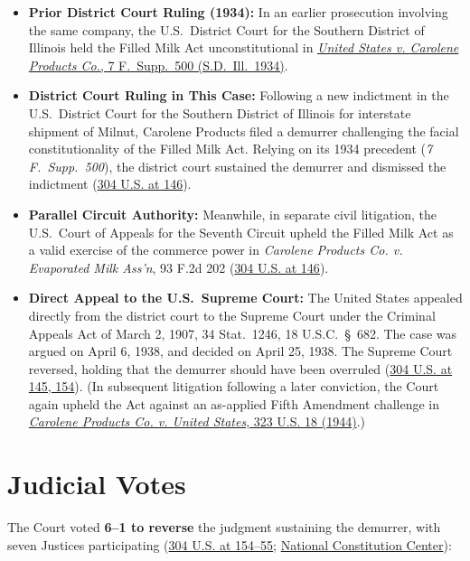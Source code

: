 \documentclass[12pt]{article}
\begin{document}
\begin{itemize}
    \item \textbf{Prior District Court Ruling (1934):} In an earlier prosecution involving the same company, the U.S.~District Court for the Southern District of Illinois held the Filled Milk Act unconstitutional in \href{https://law.justia.com/cases/federal/district-courts/FSupp/7/500/1943047/}{\textit{United States v. Carolene Products Co.}, 7 F.~Supp.~500 (S.D.~Ill.~1934)}.
    \item \textbf{District Court Ruling in This Case:} Following a new indictment in the U.S.~District Court for the Southern District of Illinois for interstate shipment of Milnut, Carolene Products filed a demurrer challenging the facial constitutionality of the Filled Milk Act. Relying on its 1934 precedent (\textit{7 F.~Supp.~500}), the district court sustained the demurrer and dismissed the indictment (\href{https://supreme.justia.com/cases/federal/us/304/144/}{304 U.S. at 146}).
    \item \textbf{Parallel Circuit Authority:} Meanwhile, in separate civil litigation, the U.S.~Court of Appeals for the Seventh Circuit upheld the Filled Milk Act as a valid exercise of the commerce power in \textit{Carolene Products Co. v. Evaporated Milk Ass'n}, 93 F.2d 202 (\href{https://supreme.justia.com/cases/federal/us/304/144/}{304 U.S. at 146}).
    \item \textbf{Direct Appeal to the U.S.~Supreme Court:} The United States appealed directly from the district court to the Supreme Court under the Criminal Appeals Act of March 2, 1907, 34 Stat.~1246, 18 U.S.C.~\S~682. The case was argued on April 6, 1938, and decided on April 25, 1938. The Supreme Court reversed, holding that the demurrer should have been overruled (\href{https://supreme.justia.com/cases/federal/us/304/144/}{304 U.S. at 145, 154}). (In subsequent litigation following a later conviction, the Court again upheld the Act against an as-applied Fifth Amendment challenge in \href{https://supreme.justia.com/cases/federal/us/323/18/}{\textit{Carolene Products Co. v. United States}, 323 U.S. 18 (1944)}.)
\end{itemize}

\section{Judicial Votes}

The Court voted \textbf{6--1 to reverse} the judgment sustaining the demurrer, with seven Justices participating (\href{https://supreme.justia.com/cases/federal/us/304/144/}{304 U.S. at 154--55}; \href{https://constitutioncenter.org/the-constitution/supreme-court-case-library/united-states-v-carolene-products-co}{National Constitution Center}):
\end{document}
